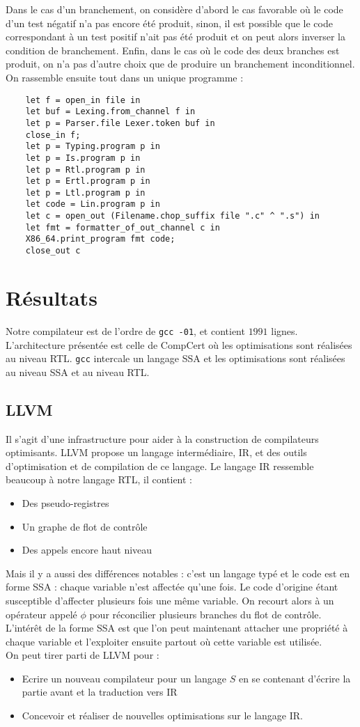 \documentclass{cours}
\begin{document}
Dans le cas d'un branchement, on considère d'abord le cas favorable où le code d'un test négatif n'a pas encore été produit, sinon, il est possible que le code correspondant à un test positif n'ait pas été produit et on peut alors inverser la condition de branchement. Enfin, dans le cas où le code des deux branches est produit, on n'a pas d'autre choix que de produire un branchement inconditionnel. \\
On rassemble ensuite tout dans un unique programme :
\begin{verbatim}
    let f = open_in file in
    let buf = Lexing.from_channel f in
    let p = Parser.file Lexer.token buf in
    close_in f;
    let p = Typing.program p in
    let p = Is.program p in
    let p = Rtl.program p in
    let p = Ertl.program p in
    let p = Ltl.program p in
    let code = Lin.program p in
    let c = open_out (Filename.chop_suffix file ".c" ^ ".s") in
    let fmt = formatter_of_out_channel c in
    X86_64.print_program fmt code;
    close_out c
\end{verbatim}

\section{Résultats}
Notre compilateur est de l'ordre de \texttt{gcc -01}, et contient $1991$ lignes. \\
L'architecture présentée est celle de CompCert où les optimisations sont réalisées au niveau RTL. \texttt{gcc} intercale un langage SSA et les optimisations sont réalisées au niveau SSA et au niveau RTL.
\subsection{LLVM}
Il s'agit d'une infrastructure pour aider à la construction de compilateurs optimisants. LLVM propose un langage intermédiaire, IR, et des outils d'optimisation et de compilation de ce langage. Le langage IR ressemble beaucoup à notre langage RTL, il contient :
\begin{itemize}
    \item Des pseudo-registres
    \item Un graphe de flot de contrôle
    \item Des appels encore haut niveau
\end{itemize}
Mais il y a aussi des différences notables : c'est un langage typé et le code est en forme SSA : chaque variable n'est affectée qu'une fois. Le code d'origine étant susceptible d'affecter plusieurs fois une même variable. On recourt alors à un opérateur appelé $\phi$ pour réconcilier plusieurs branches du flot de contrôle.\\
L'intérêt de la forme SSA est que l'on peut maintenant attacher une propriété à chaque variable et l'exploiter ensuite partout où cette variable est utilisée. \\

On peut tirer parti de LLVM pour :
\begin{itemize}
    \item Ecrire un nouveau compilateur pour un langage $S$ en se contenant d'écrire la partie avant et la traduction vers IR
    \item Concevoir et réaliser de nouvelles optimisations sur le langage IR.
\end{itemize}
\end{document}
